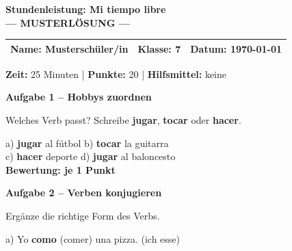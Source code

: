 \documentclass[11pt, a4paper]{article}
\newcommand{\fachfarbe}{spanisch}
\newcommand{\thema}{Stundenleistung: Mi tiempo libre}
\newcommand{\klasse}{7}
\newcommand{\maxpunkte}{20}
\newcommand{\zeit}{25 Minuten}
\newcommand{\datum}{\today}
\newcommand{\punktebox}[1]{\hfill\fbox{\small \_/#1}}
\newcommand{\lsg}[1]{\textcolor{loesung}{\textbf{#1}}}
\newenvironment{aufgabe}[1]{%
    \needspace{5\baselineskip}%
    \nopagebreak[4]%
    \vspace{10pt}
    \noindent\textbf{\textcolor{\fachfarbe}{Aufgabe #1}}
    \nopagebreak[4]%
    \vspace{5pt}
    \nopagebreak[4]%
    \begin{list}{}{\leftmargin=0pt}
    \item[]
}{%
    \end{list}
}
\newcommand{\es}[1]{\textcolor{\fachfarbe}{\textbf{#1}}}
\begin{document}
\begin{center}
    {\Large\bfseries\textcolor{\fachfarbe}{\thema}}\\[0.3em]
    {\large\textcolor{loesung}{\textbf{--- MUSTERLÖSUNG ---}}}
\end{center}

\vspace{5pt}

\noindent
\begin{tabularx}{\textwidth}{|X|X|X|}
\hline
\textbf{Name:} \lsg{Musterschüler/in} &
\textbf{Klasse:} \klasse &
\textbf{Datum:} \datum \\
\hline
\end{tabularx}

\vspace{10pt}

\begin{infobox}
\textbf{Zeit:} \zeit{} | \textbf{Punkte:} \maxpunkte{} | \textbf{Hilfsmittel:} keine
\end{infobox}

\vspace{15pt}


\begin{aufgabe}{1 -- Hobbys zuordnen}
Welches Verb passt? Schreibe \es{jugar}, \es{tocar} oder \es{hacer}. \punktebox{4}
\end{aufgabe}

\noindent
a) \lsg{jugar} al fútbol \hfill
b) \lsg{tocar} la guitarra \\[0.8em]
c) \lsg{hacer} deporte \hfill
d) \lsg{jugar} al baloncesto \\

\lsg{Bewertung: je 1 Punkt}

\vspace{15pt}


\begin{aufgabe}{2 -- Verben konjugieren}
Ergänze die richtige Form des Verbs. \punktebox{6}
\end{aufgabe}

\noindent
a) Yo \lsg{como} (comer) una pizza. \hfill (ich esse)

\vspace{0.8em}
\end{document}
